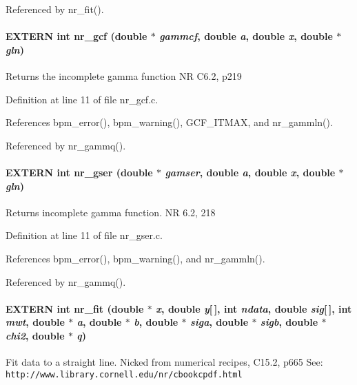 Referenced by nr\_\-fit().
\paragraph[nr\_\-gcf]{\setlength{\rightskip}{0pt plus 5cm}EXTERN int nr\_\-gcf (double $\ast$ {\em gammcf}, \/  double {\em a}, \/  double {\em x}, \/  double $\ast$ {\em gln})}\hfill\label{group__nr_g214d26a132ee71629292ba6cbba16845}


Returns the incomplete gamma function NR C6.2, p219 

Definition at line 11 of file nr\_\-gcf.c.

References bpm\_\-error(), bpm\_\-warning(), GCF\_\-ITMAX, and nr\_\-gammln().

Referenced by nr\_\-gammq().
\paragraph[nr\_\-gser]{\setlength{\rightskip}{0pt plus 5cm}EXTERN int nr\_\-gser (double $\ast$ {\em gamser}, \/  double {\em a}, \/  double {\em x}, \/  double $\ast$ {\em gln})}\hfill\label{group__nr_g4986cf7f00bbea4ebd8f9dc7079ad594}


Returns incomplete gamma function. NR 6.2, 218 

Definition at line 11 of file nr\_\-gser.c.

References bpm\_\-error(), bpm\_\-warning(), and nr\_\-gammln().

Referenced by nr\_\-gammq().
\paragraph[nr\_\-fit]{\setlength{\rightskip}{0pt plus 5cm}EXTERN int nr\_\-fit (double $\ast$ {\em x}, \/  double {\em y}[$\,$], \/  int {\em ndata}, \/  double {\em sig}[$\,$], \/  int {\em mwt}, \/  double $\ast$ {\em a}, \/  double $\ast$ {\em b}, \/  double $\ast$ {\em siga}, \/  double $\ast$ {\em sigb}, \/  double $\ast$ {\em chi2}, \/  double $\ast$ {\em q})}\hfill\label{group__nr_g0285c15fbbb9d62157503e3b87da8c4b}


Fit data to a straight line. Nicked from numerical recipes, C15.2, p665 See: {\tt http://www.library.cornell.edu/nr/cbookcpdf.html}


